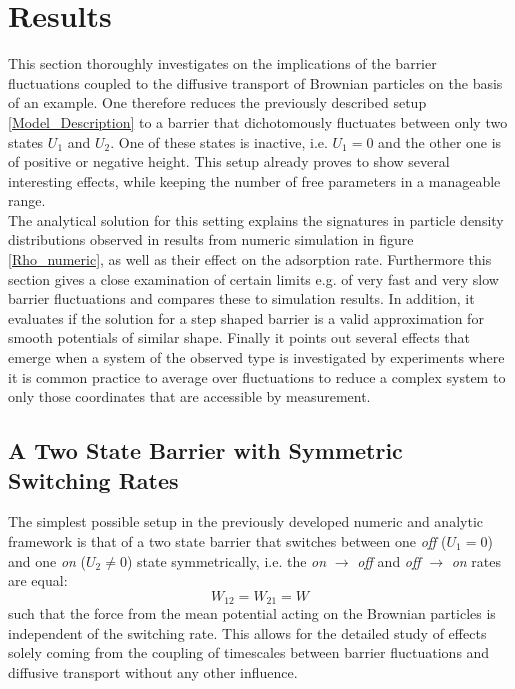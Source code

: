 \chapter{Results}
\label{results}
This section thoroughly investigates on the implications of the barrier fluctuations coupled to the diffusive transport of Brownian particles on the basis of an example. One therefore reduces the previously described setup \ref{Model_Description} to a barrier that dichotomously fluctuates between only two states $U_1$ and $U_2$. One of these states is inactive, i.e. $U_1 = 0$ and the other one is of positive or negative height. This setup already proves to show several interesting effects, while keeping the number of free parameters in a manageable range.\\
The analytical solution for this setting explains the signatures in particle density distributions observed in results from numeric simulation in figure \ref{Rho_numeric}, as well as their effect on the adsorption rate. Furthermore this section gives a close examination of certain limits e.g. of very fast and very slow barrier fluctuations and compares these to simulation results. In addition, it evaluates if the solution for a step shaped barrier is a valid approximation for smooth potentials of similar shape. Finally it points out several effects that emerge when a system of the observed type is investigated by experiments where it is common practice to average over fluctuations to reduce a complex system to only those coordinates that are accessible by measurement.\\
\section*{A Two State Barrier with Symmetric Switching Rates}
The simplest possible setup in the previously developed numeric and analytic framework is that of a two state barrier that switches between one \emph{off} ($U_1 = 0$) and one \emph{on} ($U_2 \ne 0$) state symmetrically, i.e. the \emph{on} $\rightarrow$ \emph{off} and \emph{off} $\rightarrow$ \emph{on} rates are equal: 
\begin{equation}
    W_{1 2}=W_{2 1}=W
    \label{symmetric_rates}
\end{equation}
such that the force from the mean potential acting on the Brownian particles is independent of the switching rate.
This allows for the detailed study of effects solely coming from the coupling of timescales between barrier fluctuations and diffusive transport without any other influence.
